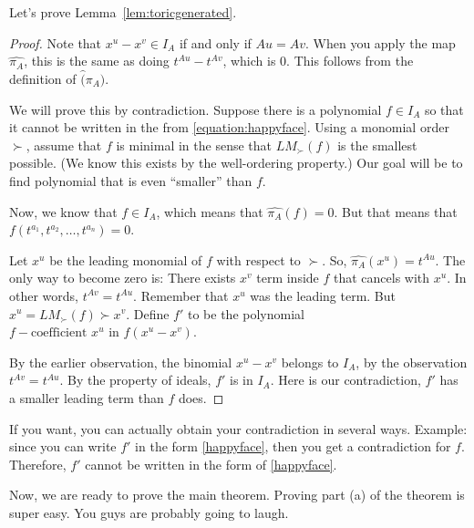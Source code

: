 Let's prove Lemma~\ref{lem:toricgenerated}.

\begin{proof}
Note that $x^u - x^v \in I_A$ if and only if $Au = Av$. When you apply the map $\widehat{\pi_A}$, this is the same as doing $t^{Au} - t^{Av}$, which is $0$. This follows from the definition of $\widehat(\pi_A)$.

We will prove this by contradiction. Suppose there is a polynomial $f \in I_A$ so that it cannot be written in the from \eqref{equation:happyface}. Using a monomial order $\succ$, assume that $f$ is minimal in the sense that $LM_\succ(f)$ is the smallest possible. (We know this exists by the well-ordering property.) Our goal will be to find polynomial that is even ``smaller'' than $f$.

Now, we know that $f \in I_A$, which means that $\widehat{\pi_A}(f) = 0$. But that means that $f(t^{a_1}, t^{a_2}, \ldots, t^{a_n}) = 0$.

Let $x^u$ be the leading monomial of $f$ with respect to $\succ$. 
So, $\widehat{\pi_A}(x^u) = t^{Au}$.
The only way to become zero is: There exists $x^v$ term inside $f$ that cancels with $x^u$.
In other words, $t^{Av} = t^{Au}$.
Remember that $x^u$ was the leading term.
But $x^u = LM_\succ(f) \succ x^v$. Define $f'$ to be the polynomial $f - \text{coefficient } x^u \text{ in } f (x^u - x^v)$.

By the earlier observation, the binomial $x^u - x^v$ belongs to $I_A$, by the observation $t^{Av} = t^{Au}$. By the property of ideals, $f'$ is in $I_A$. Here is our contradiction, $f'$ has a smaller leading term than $f$ does.
\end{proof}

If you want, you can actually obtain your contradiction in several ways. Example: since you can write $f'$ in the form \eqref{happyface}, then you get a contradiction for $f$. Therefore, $f'$ cannot be written in the form of \eqref{happyface}.

Now, we are ready to prove the main theorem.
Proving part (a) of the theorem is super easy. You guys are probably going to laugh.

